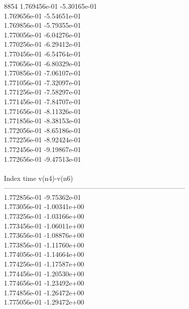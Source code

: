 8854	1.769456e-01	-5.30165e-01	\\ 	1.769656e-01	-5.54651e-01	\\ 	1.769856e-01	-5.79355e-01	\\ 	1.770056e-01	-6.04276e-01	\\ 	1.770256e-01	-6.29412e-01	\\ 	1.770456e-01	-6.54764e-01	\\ 	1.770656e-01	-6.80329e-01	\\ 	1.770856e-01	-7.06107e-01	\\ 	1.771056e-01	-7.32097e-01	\\ 	1.771256e-01	-7.58297e-01	\\ 	1.771456e-01	-7.84707e-01	\\ 	1.771656e-01	-8.11326e-01	\\ 	1.771856e-01	-8.38153e-01	\\ 	1.772056e-01	-8.65186e-01	\\ 	1.772256e-01	-8.92424e-01	\\ 	1.772456e-01	-9.19867e-01	\\ 	1.772656e-01	-9.47513e-01	\\ \hline
\\ \hline
Index   time            v(n4)-v(n6)     \\ \hline
--------------------------------------------------------------------------------\\ 	1.772856e-01	-9.75362e-01	\\ 	1.773056e-01	-1.00341e+00	\\ 	1.773256e-01	-1.03166e+00	\\ 	1.773456e-01	-1.06011e+00	\\ 	1.773656e-01	-1.08876e+00	\\ 	1.773856e-01	-1.11760e+00	\\ 	1.774056e-01	-1.14664e+00	\\ 	1.774256e-01	-1.17587e+00	\\ 	1.774456e-01	-1.20530e+00	\\ 	1.774656e-01	-1.23492e+00	\\ 	1.774856e-01	-1.26472e+00	\\ 	1.775056e-01	-1.29472e+00	\\ \hline
